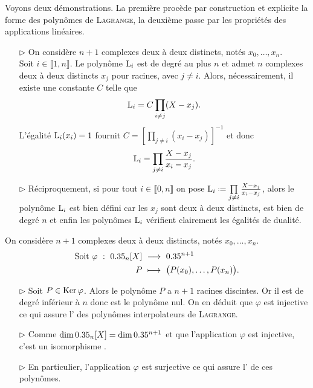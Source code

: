 Voyons deux démonstrations. La première procède par construction et explicite la forme des polynômes de \textsc{Lagrange}, la deuxième passe par les propriétés des applications linéaires.
\begin{preuve}
    \begin{itemize}
        \item[$\rhd$] On considère $n + 1$ complexes deux à deux distincts, notés $x_0, \dots, x_n$. \\
        Soit $i \in \llbracket 1, n \rrbracket$. Le polynôme $\mathrm{L}_i$ est de degré au plus $n$ et admet $n$ complexes deux à deux distincts $x_j$ pour racines, avec $j \not= i$. Alors, nécessairement, il existe une constante $C$ telle que 
        $$\mathrm{L}_i = C \prod_{i \not= j} (X-x_j).$$
        L'égalité $\mathrm{L}_i(x_i) = 1$ fournit $C = \left[ \prod\limits_{j \not=i}(x_i - x_j) \right]^{-1}$ et donc 
        $$\mathrm{L}_i = \prod_{j \neq i} \frac{X-x_j}{x_i - x_j}.$$
        \item[$\rhd$] Réciproquement, si pour tout $i \in \llbracket 0, n\rrbracket$ on pose $\Lag_i \defeq \prod\limits_{j \neq i} \frac{X-x_j}{x_i - x_j}$, alors le polynôme $\mathrm{L}_i$ est bien défini car les $x_j$ sont deux à deux distincts, est bien de degré $n$ et enfin les polynômes $\mathrm{L}_i$ vérifient clairement les égalités de dualité.
    \end{itemize}
\end{preuve}
\begin{preuve}
    On considère $n + 1$ complexes deux à deux distincts, notés $x_0, \dots, x_n$.
    \begin{alignat*}{2}
        \text{Soit } \varphi\ :\ \R_n[X]\ &\longrightarrow\ \R^{n+1}\\
        P\ &\longmapsto\ \big(P(x_0), \dots, P(x_n) \big).
    \end{alignat*}
    \begin{itemize}
        \item[$\rhd$] Soit $P \in \mathrm{Ker}\, \varphi$. Alors le polynôme $P$ a $n+1$ racines discintes. Or il est de degré inférieur à $n$ donc est le polynôme nul. On en déduit que $\varphi$ est injective ce qui assure l' des polynômes interpolateurs de \textsc{Lagrange}.
        \item[$\rhd$] Comme $\dim 0.35_n[X] = \dim 0.35^{n+1}$ et que l'application $\varphi$ est injective, c'est un isomorphisme \note.
        \item[$\rhd$] En particulier, l'application $\varphi$ est surjective ce qui assure l' de ces polynômes. 
    \end{itemize}
\end{preuve}

